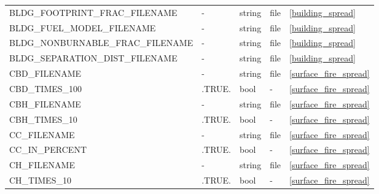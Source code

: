 \begin{landscape}
\begin{center}
\begin{longtable}{lllll}
BLDG\_FOOTPRINT\_FRAC\_FILENAME              & -                          & string                 & file                               & \ref{building_spread}                \\
BLDG\_FUEL\_MODEL\_FILENAME                  & -                          & string                 & file                               & \ref{building_spread}                \\
BLDG\_NONBURNABLE\_FRAC\_FILENAME            & -                          & string                 & file                               & \ref{building_spread}                \\
BLDG\_SEPARATION\_DIST\_FILENAME             & -                          & string                 & file                               & \ref{building_spread}                \\
CBD\_FILENAME                                & -                          & string                 & file                               & \ref{surface_fire_spread}            \\
CBD\_TIMES\_100                              & .TRUE.                     & bool                   & -                                  & \ref{surface_fire_spread}            \\
CBH\_FILENAME                                & -                          & string                 & file                               & \ref{surface_fire_spread}            \\
CBH\_TIMES\_10                               & .TRUE.                     & bool                   & -                                  & \ref{surface_fire_spread}            \\
CC\_FILENAME                                 & -                          & string                 & file                               & \ref{surface_fire_spread}            \\
CC\_IN\_PERCENT                              & .TRUE.                     & bool                   & -                                  & \ref{surface_fire_spread}            \\
CH\_FILENAME                                 & -                          & string                 & file                               & \ref{surface_fire_spread}            \\
CH\_TIMES\_10                                & .TRUE.                     & bool                   & -                                  & \ref{surface_fire_spread}            \\

\end{longtable}
\end{center}
\end{landscape}
